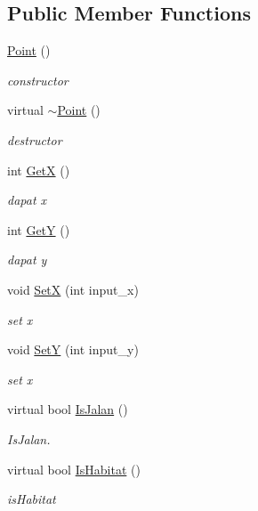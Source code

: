 \subsection*{Public Member Functions}
\begin{DoxyCompactItemize}
\item 
\hyperlink{class_point_ad92f2337b839a94ce97dcdb439b4325a}{Point} ()\hypertarget{class_point_ad92f2337b839a94ce97dcdb439b4325a}{}\label{class_point_ad92f2337b839a94ce97dcdb439b4325a}

\begin{DoxyCompactList}\small\item\em constructor \end{DoxyCompactList}\item 
virtual \hyperlink{class_point_a395fa04b4ec126b66fc053f829a30cc1}{$\sim$\+Point} ()\hypertarget{class_point_a395fa04b4ec126b66fc053f829a30cc1}{}\label{class_point_a395fa04b4ec126b66fc053f829a30cc1}

\begin{DoxyCompactList}\small\item\em destructor \end{DoxyCompactList}\item 
int \hyperlink{class_point_a56ef488d55611d823a35eb1655f1de7a}{GetX} ()
\begin{DoxyCompactList}\small\item\em dapat x \end{DoxyCompactList}\item 
int \hyperlink{class_point_aa42c18de4df078af493363a423fd9580}{GetY} ()
\begin{DoxyCompactList}\small\item\em dapat y \end{DoxyCompactList}\item 
void \hyperlink{class_point_a481f375a96579f2f7dba9217998e0b90}{SetX} (int input\+\_\+x)
\begin{DoxyCompactList}\small\item\em set x \end{DoxyCompactList}\item 
void \hyperlink{class_point_af1b6c0ec79490c0ead87720df985a47e}{SetY} (int input\+\_\+y)
\begin{DoxyCompactList}\small\item\em set x \end{DoxyCompactList}\item 
virtual bool \hyperlink{class_point_a09d84d2aa58ff1257e4c08ff472c6530}{Is\+Jalan} ()
\begin{DoxyCompactList}\small\item\em Is\+Jalan. \end{DoxyCompactList}\item 
virtual bool \hyperlink{class_point_a3f1c658377b38bc7b05eea32dab203fb}{Is\+Habitat} ()
\begin{DoxyCompactList}\small\item\em is\+Habitat \end{DoxyCompactList}\end{DoxyCompactItemize}
